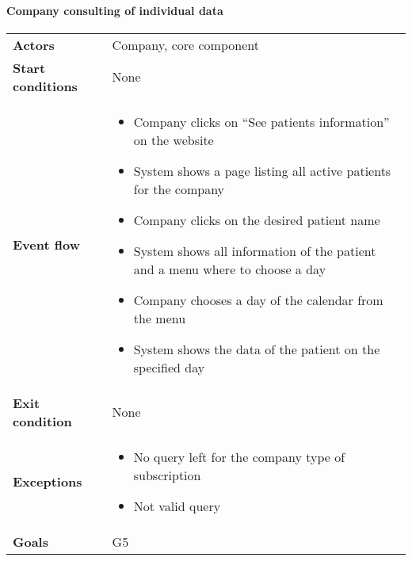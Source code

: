









\paragraph{Company consulting of individual data }
\begin{center}
\begin{table}[H]
\centering
\begin{tabular}{l|l}
\textbf{Actors} & Company, core component \\
\textbf{Start conditions} & None \\
\textbf{Event flow}  & 
\begin{minipage}[t]{0.7\textwidth}
    \begin{itemize}
        \item Company clicks on “See patients information” on the website

\item System shows a page listing all active patients for the company

\item Company clicks on the desired patient name

\item System shows all information of the patient and a menu where to choose a day 

\item Company chooses a day of the calendar from the menu
\item System shows the data of the patient on the specified day

    \end{itemize}
    
\end{minipage}\\
\textbf{Exit condition} & None \\
\textbf{Exceptions} & \begin{minipage}[t]{0.7\textwidth}
    \begin{itemize}
       \item No query left for the company type of subscription
        \item Not valid query

    \end{itemize}
    
\end{minipage} \\
\textbf{Goals} & G5 
\end{tabular}

\end{table}
\end{center}














